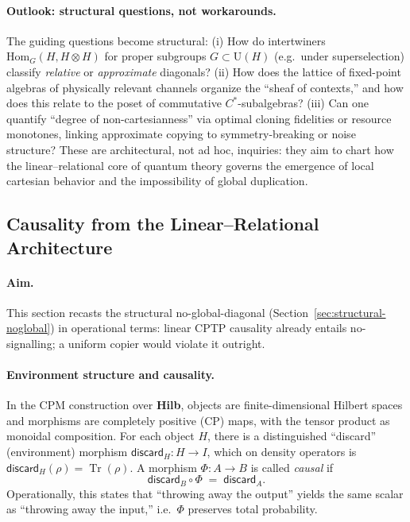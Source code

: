 \documentclass[11pt]{article}
\theoremstyle{upright}
\begin{document}
\paragraph{Outlook: structural questions, not workarounds.}
The guiding questions become structural: (i) How do intertwiners $\mathrm{Hom}_{G}(H,H\otimes H)$ for proper subgroups $G\!\subset\!\mathrm{U}(H)$ (e.g.\ under superselection) classify \emph{relative} or \emph{approximate} diagonals? (ii) How does the lattice of fixed-point algebras of physically relevant channels organize the ``sheaf of contexts,'' and how does this relate to the poset of commutative $C^\ast$-subalgebras? (iii) Can one quantify ``degree of non-cartesianness'' via optimal cloning fidelities or resource monotones, linking approximate copying to symmetry-breaking or noise structure? These are architectural, not ad hoc, inquiries: they aim to chart how the linear--relational core of quantum theory governs the emergence of local cartesian behavior and the impossibility of global duplication.

\subsection{Causality from the Linear--Relational Architecture}
\label{sec:causality}

\paragraph{Aim.}
This section recasts the structural no-global-diagonal (Section~\ref{sec:structural-noglobal}) in operational terms: linear CPTP causality already entails no-signalling; a uniform copier would violate it outright.

\paragraph{Environment structure and causality.}
In the CPM construction over \textbf{Hilb}, objects are finite-dimensional Hilbert spaces and morphisms are completely positive (CP) maps, with the tensor product as monoidal composition. For each object $H$, there is a distinguished ``discard'' (environment) morphism $\mathsf{discard}_H: H \to I$, which on density operators is $\mathsf{discard}_H(\rho)=\operatorname{Tr}(\rho)$. A morphism $\Phi:A\to B$ is called \emph{causal} if
\begin{equation}
\mathsf{discard}_B \circ \Phi \;=\; \mathsf{discard}_A.
\label{eq:causal-eqn}
\end{equation}
Operationally, this states that ``throwing away the output'' yields the same scalar as ``throwing away the input,'' i.e.\ $\Phi$ preserves total probability.
\end{document}
